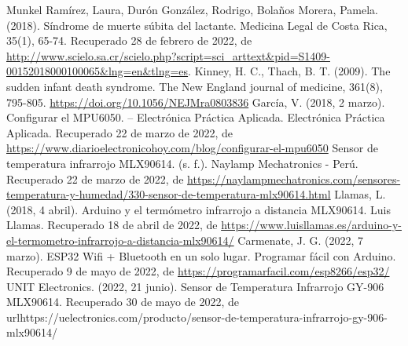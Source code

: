 
\begin{thebibliography}{00}
     Munkel Ramírez, Laura, Durón González, Rodrigo, Bolaños Morera, Pamela. (2018). Síndrome de muerte súbita del lactante. Medicina Legal de Costa Rica, 35(1), 65-74. Recuperado 28 de febrero de 2022, de \url{http://www.scielo.sa.cr/scielo.php?script=sci_arttext&pid=S1409-00152018000100065&lng=en&tlng=es}.
     Kinney, H. C., Thach, B. T. (2009). The sudden infant death syndrome. The New England journal of medicine, 361(8), 795-805. \url{https://doi.org/10.1056/NEJMra0803836}
     García, V. (2018, 2 marzo). Configurar el MPU6050. – Electrónica Práctica Aplicada. Electrónica Práctica Aplicada. Recuperado 22 de marzo de 2022, de \url{https://www.diarioelectronicohoy.com/blog/configurar-el-mpu6050}
     Sensor de temperatura infrarrojo MLX90614. (s. f.). Naylamp Mechatronics - Perú. Recuperado 22 de marzo de 2022, de \url{https://naylampmechatronics.com/sensores-temperatura-y-humedad/330-sensor-de-temperatura-mlx90614.html}
     Llamas, L. (2018, 4 abril). Arduino y el termómetro infrarrojo a distancia MLX90614. Luis Llamas. Recuperado 18 de abril de 2022, de \url{https://www.luisllamas.es/arduino-y-el-termometro-infrarrojo-a-distancia-mlx90614/}
     Carmenate, J. G. (2022, 7 marzo). ESP32 Wifi + Bluetooth en un solo lugar. Programar fácil con Arduino. Recuperado 9 de mayo de 2022, de \url{https://programarfacil.com/esp8266/esp32/}
     UNIT Electronics. (2022, 21 junio). Sensor de Temperatura Infrarrojo GY-906 MLX90614. Recuperado 30 de mayo de 2022, de url{https://uelectronics.com/producto/sensor-de-temperatura-infrarrojo-gy-906-mlx90614/}
\end{thebibliography}

\printglossary[type=\acronymtype]